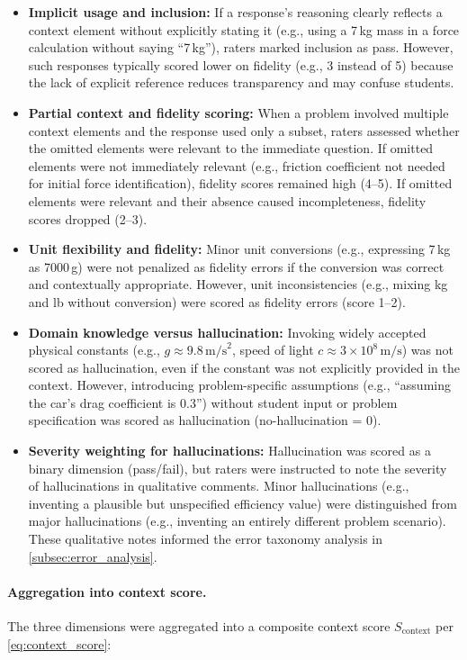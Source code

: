 \begin{itemize}
	\item \textbf{Implicit usage and inclusion:} If a response's reasoning clearly reflects a context element without explicitly stating it (e.g., using a 7\,kg mass in a force calculation without saying ``7\,kg''), raters marked inclusion as pass. However, such responses typically scored lower on fidelity (e.g., 3 instead of 5) because the lack of explicit reference reduces transparency and may confuse students.
	\item \textbf{Partial context and fidelity scoring:} When a problem involved multiple context elements and the response used only a subset, raters assessed whether the omitted elements were relevant to the immediate question. If omitted elements were not immediately relevant (e.g., friction coefficient not needed for initial force identification), fidelity scores remained high (4--5). If omitted elements were relevant and their absence caused incompleteness, fidelity scores dropped (2--3).
	\item \textbf{Unit flexibility and fidelity:} Minor unit conversions (e.g., expressing 7\,kg as 7000\,g) were not penalized as fidelity errors if the conversion was correct and contextually appropriate. However, unit inconsistencies (e.g., mixing kg and lb without conversion) were scored as fidelity errors (score 1--2).
	\item \textbf{Domain knowledge versus hallucination:} Invoking widely accepted physical constants (e.g., $g \approx 9.8\,\text{m/s}^2$, speed of light $c \approx 3 \times 10^8\,\text{m/s}$) was not scored as hallucination, even if the constant was not explicitly provided in the context. However, introducing problem-specific assumptions (e.g., ``assuming the car's drag coefficient is 0.3'') without student input or problem specification was scored as hallucination (no-hallucination = 0).
	\item \textbf{Severity weighting for hallucinations:} Hallucination was scored as a binary dimension (pass/fail), but raters were instructed to note the severity of hallucinations in qualitative comments. Minor hallucinations (e.g., inventing a plausible but unspecified efficiency value) were distinguished from major hallucinations (e.g., inventing an entirely different problem scenario). These qualitative notes informed the error taxonomy analysis in \cref{subsec:error_analysis}.
\end{itemize}

\paragraph{Aggregation into context score.} The three dimensions were aggregated into a composite context score $S_{\text{context}}$ per \cref{eq:context_score}:

